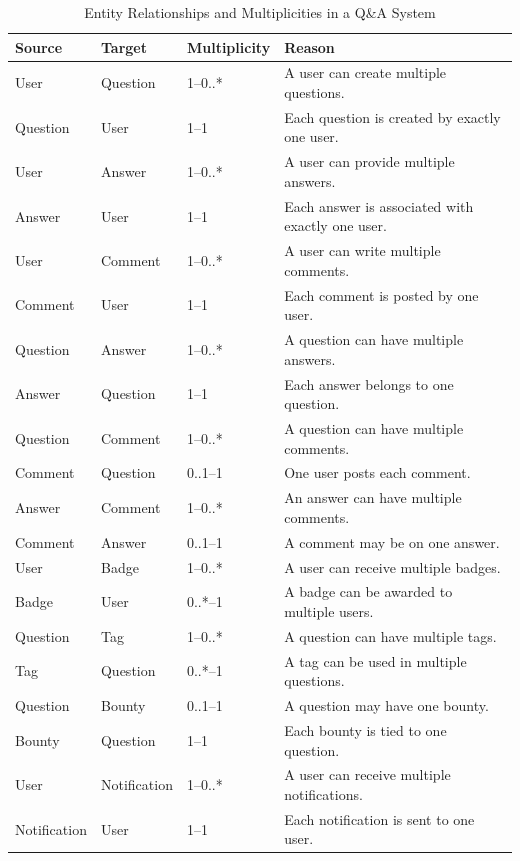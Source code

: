 \begin{table}[h!]
\centering
\begin{tabular}{|p{3.5cm}|p{3.5cm}|p{3cm}|p{6.5cm}|}
\hline
\textbf{Source} & \textbf{Target} & \textbf{Multiplicity} & \textbf{Reason} \\
\hline
User & Question & 1--0..* & A user can create multiple questions. \\
\hline
Question & User & 1--1 & Each question is created by exactly one user. \\
\hline
User & Answer & 1--0..* & A user can provide multiple answers. \\
\hline
Answer & User & 1--1 & Each answer is associated with exactly one user. \\
\hline
User & Comment & 1--0..* & A user can write multiple comments. \\
\hline
Comment & User & 1--1 & Each comment is posted by one user. \\
\hline
Question & Answer & 1--0..* & A question can have multiple answers. \\
\hline
Answer & Question & 1--1 & Each answer belongs to one question. \\
\hline
Question & Comment & 1--0..* & A question can have multiple comments. \\
\hline
Comment & Question & 0..1--1 & One user posts each comment. \\
\hline
Answer & Comment & 1--0..* & An answer can have multiple comments. \\
\hline
Comment & Answer & 0..1--1 & A comment may be on one answer. \\
\hline
User & Badge & 1--0..* & A user can receive multiple badges. \\
\hline
Badge & User & 0..*--1 & A badge can be awarded to multiple users. \\
\hline
Question & Tag & 1--0..* & A question can have multiple tags. \\
\hline
Tag & Question & 0..*--1 & A tag can be used in multiple questions. \\
\hline
Question & Bounty & 0..1--1 & A question may have one bounty. \\
\hline
Bounty & Question & 1--1 & Each bounty is tied to one question. \\
\hline
User & Notification & 1--0..* & A user can receive multiple notifications. \\
\hline
Notification & User & 1--1 & Each notification is sent to one user. \\
\hline
\end{tabular}
\caption{Entity Relationships and Multiplicities in a Q\&A System}
\label{tab:qa_entity_relationships}
\end{table}


